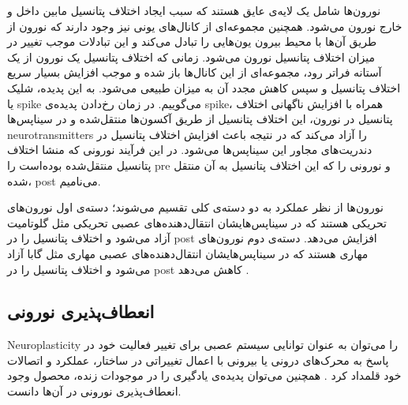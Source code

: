 \documentclass[12pt]{report}
\begin{document}
	
	نورون‌ها شامل یک لایه‌ی عایق هستند که سبب ایجاد اختلاف پتانسیل مابین داخل و خارج نورون می‌شود. همچنین مجموعه‌ای از کانال‌های یونی نیز وجود دارند که نورون از طریق آن‌ها با محیط بیرون یون‌هایی را تبادل می‌کند و این تبادلات موجب تغییر در میزان اختلاف پتانسیل نورون می‌شود. زمانی که اختلاف پتانسیل یک نورون از یک آستانه فراتر رود، مجموعه‌ای از این کانال‌ها باز شده و موجب افزایش بسیار سریع اختلاف پتانسیل و سپس کاهش مجدد آن به میزان طبیعی می‌شود. به این پدیده، شلیک یا \gls{spike} می‌گوییم. در زمان رخ‌دادن پدیده‌ی \gls{spike}، همراه با افزایش ناگهانی اختلاف پتانسیل در نورون، این اختلاف پتانسیل از طریق آکسون‌ها منتقل‌شده و در سیناپس‌ها \gls{neurotransmitters} را آزاد می‌کند  که در نتیجه باعث افزایش اختلاف پتانسیل در دندریت‌های مجاور این سیناپس‌ها می‌شود. در این فرآیند نورونی که منشا اختلاف پتانسیل منتقل‌شده بوده‌است را \gls{pre}‌ و نورونی را که این اختلاف پتانسیل به آن منتقل شده، \gls{post}‌ می‌نامیم.
	
	نورون‌ها از نظر عملکرد به دو دسته‌ی کلی تقسیم می‌شوند؛ دسته‌ی اول نورون‌های تحریکی هستند که در سیناپس‌هایشان انتقال‌دهنده‌های عصبی تحریکی مثل گلوتامیت آزاد می‌شود و اختلاف پتانسیل را در \gls{post} افزایش می‌دهد. دسته‌ی دوم نورون‌های مهاری هستند که در سیناپس‌هایشان انتقال‌دهنده‌های عصبی مهاری مثل گابا آزاد می‌شود و اختلاف پتانسیل را در \gls{post} کاهش می‌دهد
	\cite{Purves2001-ns}.
	
	
	\subsection{انعطاف‌پذیری نورونی}
	
	\gls{Neuroplasticity} را می‌توان به عنوان توانایی سیستم عصبی برای تغییر فعالیت خود در پاسخ به محرک‌های درونی یا بیرونی با اعمال تغییراتی در ساختار، عملکرد و اتصالات خود قلمداد کرد
	\cite{MateosAparicio2019}.
	همچنین می‌توان پدیده‌ی یادگیری را در موجودات زنده، محصول وجود انعطاف‌پذیری نورونی در آن‌ها دانست.
	
\end{document}
